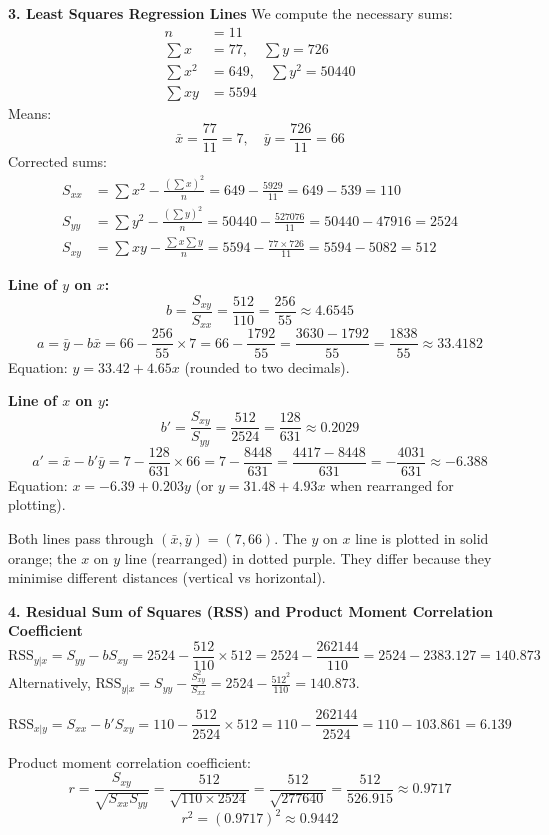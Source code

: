 \documentclass[11pt]{article}
\begin{document}
\begin{exoresolu}
\textbf{3. Least Squares Regression Lines}
We compute the necessary sums:
\[
\begin{aligned}
n &= 11 \\
\sum x &= 77,\quad \sum y = 726 \\
\sum x^2 &= 649,\quad \sum y^2 = 50440 \\
\sum xy &= 5594
\end{aligned}
\]
Means:
\[
\bar{x} = \frac{77}{11} = 7,\quad \bar{y} = \frac{726}{11} = 66
\]
Corrected sums:
\[
\begin{aligned}
S_{xx} &= \sum x^2 - \frac{(\sum x)^2}{n} = 649 - \frac{5929}{11} = 649 - 539 = 110 \\
S_{yy} &= \sum y^2 - \frac{(\sum y)^2}{n} = 50440 - \frac{527076}{11} = 50440 - 47916 = 2524 \\
S_{xy} &= \sum xy - \frac{\sum x \sum y}{n} = 5594 - \frac{77 \times 726}{11} = 5594 - 5082 = 512
\end{aligned}
\]

\textbf{Line of $y$ on $x$:}
\[
b = \frac{S_{xy}}{S_{xx}} = \frac{512}{110} = \frac{256}{55} \approx 4.6545
\]
\[
a = \bar{y} - b\bar{x} = 66 - \frac{256}{55} \times 7 = 66 - \frac{1792}{55} = \frac{3630 - 1792}{55} = \frac{1838}{55} \approx 33.4182
\]
Equation: $\boxed{y = 33.42 + 4.65x}$ (rounded to two decimals).

\textbf{Line of $x$ on $y$:}
\[
b' = \frac{S_{xy}}{S_{yy}} = \frac{512}{2524} = \frac{128}{631} \approx 0.2029
\]
\[
a' = \bar{x} - b'\bar{y} = 7 - \frac{128}{631} \times 66 = 7 - \frac{8448}{631} = \frac{4417 - 8448}{631} = -\frac{4031}{631} \approx -6.388
\]
Equation: $\boxed{x = -6.39 + 0.203y}$ (or $y = 31.48 + 4.93x$ when rearranged for plotting).

Both lines pass through $(\bar{x}, \bar{y}) = (7, 66)$. The $y$ on $x$ line is plotted in solid orange; the $x$ on $y$ line (rearranged) in dotted purple. They differ because they minimise different distances (vertical vs horizontal).

\textbf{4. Residual Sum of Squares (RSS) and Product Moment Correlation Coefficient}
\[
\text{RSS}_{y|x} = S_{yy} - b S_{xy} = 2524 - \frac{512}{110} \times 512 = 2524 - \frac{262144}{110} = 2524 - 2383.127 = 140.873
\]
Alternatively, $\text{RSS}_{y|x} = S_{yy} - \frac{S_{xy}^2}{S_{xx}} = 2524 - \frac{512^2}{110} = 140.873$.

\[
\text{RSS}_{x|y} = S_{xx} - b' S_{xy} = 110 - \frac{512}{2524} \times 512 = 110 - \frac{262144}{2524} = 110 - 103.861 = 6.139
\]

Product moment correlation coefficient:
\[
r = \frac{S_{xy}}{\sqrt{S_{xx} S_{yy}}} = \frac{512}{\sqrt{110 \times 2524}} = \frac{512}{\sqrt{277640}} = \frac{512}{526.915} \approx 0.9717
\]
\[
r^2 = (0.9717)^2 \approx 0.9442
\]


\end{exoresolu}
\end{document}
